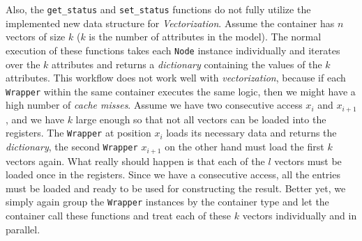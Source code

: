 Also, the \texttt{get\_status} and \texttt{set\_status} functions do not fully utilize the implemented new data structure for \emph{Vectorization}. Assume the container has $n$ vectors of size $k$ ($k$ is the number of attributes in the model). The normal execution of these functions takes each \texttt{Node} instance individually and iterates over the $k$ attributes and returns a \emph{dictionary} containing the values of the $k$ attributes. This workflow does not work well with \emph{vectorization}, because if  each \texttt{Wrapper} within the same container executes the same logic, then we might have a high number of \emph{cache misses}. Assume we have two consecutive access $x_i$ and $x_{i+1}$, and we have $k$ large enough so that not all vectors can be loaded into the registers. The \texttt{Wrapper} at position $x_i$ loads its necessary data and returns the \emph{dictionary}, the second \texttt{Wrapper} $x_{i+1}$ on the other hand must load the first $k$ vectors again. What really should happen is that each of the $l$ vectors must be loaded once in the registers. Since we have a consecutive access, all the entries must be loaded and ready to be used for constructing the result. Better yet, we simply again group the \texttt{Wrapper} instances by  the container type and let the container call these functions and treat each of these $k$ vectors individually and in parallel.

\cleardoublepage
